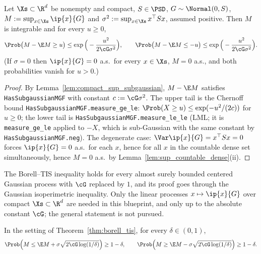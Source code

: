 \begin{theorem}\label{thm:borell_tis}
\leanok
{}
Let $\Xs \subset \R^d$ be nonempty and compact, $S \in \PSD$, $G \sim \Normal(0,S)$,
$M := \sup_{x\in\Xs}\ip{x}{G}$ and $\sigma^2 := \sup_{x\in\Xs}x^\top Sx$, assumed positive.
Then $M$ is integrable and for every $u \ge 0$,
\[
  \Prob\big(M - \E M \ge u\big) \le \exp\Big(-\frac{u^2}{2\cG\sigma^2}\Big), \qquad
  \Prob\big(M - \E M \le -u\big) \le \exp\Big(-\frac{u^2}{2\cG\sigma^2}\Big).
\]
(If $\sigma = 0$ then $\ip{x}{G} = 0$ a.s.\ for every $x\in\Xs$, $M = 0$ a.s., and both
probabilities vanish for $u > 0$.)
\end{theorem}

\begin{proof}
\leanok
{}
By Lemma~\ref{lem:compact_sup_subgaussian}, $M - \E M$ satisfies \texttt{HasSubgaussianMGF}
with constant $c := \cG\sigma^2$. The upper tail is the Chernoff bound
\texttt{HasSubgaussianMGF.measure\_ge\_le}: $\Prob(X \ge u) \le \exp(-u^2/(2c))$ for $u \ge 0$;
the lower tail is \texttt{HasSubgaussianMGF.measure\_le\_le} (LML; it is
\texttt{measure\_ge\_le} applied to $-X$, which is sub-Gaussian with the same constant by
\texttt{HasSubgaussianMGF.neg}). The degenerate case: $\Var\ip{x}{G} = x^\top Sx = 0$ forces
$\ip{x}{G} = 0$ a.s.\ for each $x$, hence for all $x$ in the countable dense set
simultaneously, hence $M = 0$ a.s.\ by Lemma~\ref{lem:sup_countable_dense}(ii).
\end{proof}

\begin{remark}\label{rem:pc_borell_tis_classical}
The Borell--TIS inequality \cite[Theorem~2.1.1]{adler2007random} holds for every
almost surely bounded centered Gaussian process with $\cG$ replaced by $1$, and its proof
goes through the Gaussian isoperimetric inequality. Only the linear processes
$x\mapsto\ip{x}{G}$ over compact $\Xs \subset \R^d$ are needed in this blueprint, and only up
to the absolute constant $\cG$; the general statement is not pursued.
\end{remark}

\begin{corollary}\label{cor:sup_bound_whp}
In the setting of Theorem~\ref{thm:borell_tis}, for every $\delta \in (0,1)$,
\[
  \Prob\Big(M \le \E M + \sigma\sqrt{2\cG\log(1/\delta)}\Big) \ge 1 - \delta, \qquad
  \Prob\Big(M \ge \E M - \sigma\sqrt{2\cG\log(1/\delta)}\Big) \ge 1 - \delta .
\]
\end{corollary}

